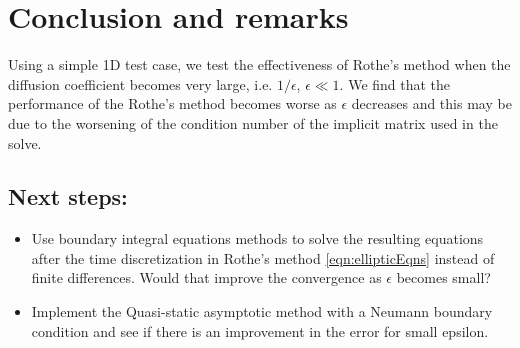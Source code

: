 \documentclass[11pt]{article}
\numberwithin{equation}{section}
\begin{document}
\section{Conclusion and remarks}
Using a simple 1D test case, we test the effectiveness of Rothe's method when the diffusion coefficient becomes very large, i.e. $1/\epsilon$, $\epsilon\ll 1$. We find that the performance of the Rothe's method becomes worse as $\epsilon$ decreases and this may be due to the worsening of the condition number of the implicit matrix used in the solve. \\

\subsection{Next steps: }
\begin{itemize}
\item Use boundary integral equations methods to solve the resulting equations after the time discretization in Rothe's method \eqref{eqn:ellipticEqns} instead of finite differences. Would that improve the convergence as $\epsilon$ becomes small? 
\item Implement the Quasi-static asymptotic method with a Neumann boundary condition and see if there is an improvement in the error for small epsilon. 
\end{itemize}
	 \clearpage



  
\end{document}
